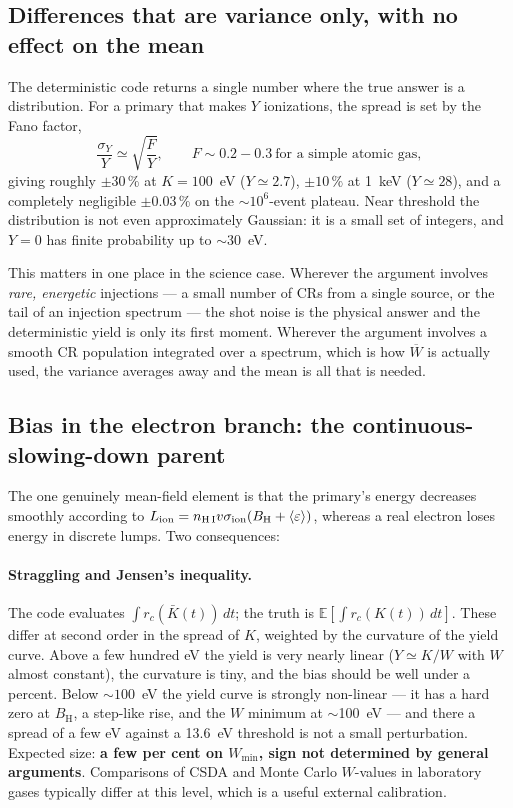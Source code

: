 \documentclass[11pt,a4paper]{article}
\newcommand{\eps}{\varepsilon}
\newcommand{\BH}{B_{\mathrm{H}}}
\newcommand{\nHI}{n_{\mathrm{H\,I}}}
\newcommand{\sion}{\sigma_{\mathrm{ion}}}
\begin{document}
\subsection{Differences that are variance only, with no effect on the mean}

The deterministic code returns a single number where the true answer is a
distribution.  For a primary that makes $Y$ ionizations, the spread is set by
the Fano factor,
\[
  \frac{\sigma_Y}{Y} \simeq \sqrt{\frac{F}{Y}}, \qquad F \sim 0.2\!-\!0.3
  \ \text{for a simple atomic gas},
\]
giving roughly $\pm 30\,\%$ at $K=100$~eV ($Y\simeq2.7$), $\pm 10\,\%$ at
1~keV ($Y\simeq28$), and a completely negligible $\pm0.03\,\%$ on the
$\sim10^{6}$-event plateau.  Near threshold the distribution is not even
approximately Gaussian: it is a small set of integers, and $Y=0$ has finite
probability up to $\sim 30$~eV.

This matters in one place in the science case.  Wherever the argument involves
\emph{rare, energetic} injections --- a small number of CRs from a single
source, or the tail of an injection spectrum --- the shot noise is the physical
answer and the deterministic yield is only its first moment.  Wherever the
argument involves a smooth CR population integrated over a spectrum, which is
how $\overline W$ is actually used, the variance averages away and the mean is
all that is needed.

\subsection{Bias in the electron branch: the continuous-slowing-down parent}

The one genuinely mean-field element is that the primary's energy decreases
smoothly according to $L_{\rm ion} = \nHI v \sion (\BH + \langle\eps\rangle)$,
whereas a real electron loses energy in discrete lumps.  Two consequences:

\paragraph{Straggling and Jensen's inequality.}  The code evaluates
$\int r_c(\bar K(t))\,dt$; the truth is $\mathbb{E}\!\left[\int
r_c(K(t))\,dt\right]$.  These differ at second order in the spread of $K$,
weighted by the curvature of the yield curve.  Above a few hundred eV the yield
is very nearly linear ($Y \simeq K/W$ with $W$ almost constant), the curvature
is tiny, and the bias should be well under a percent.  Below $\sim100$~eV the
yield curve is strongly non-linear --- it has a hard zero at $\BH$, a step-like
rise, and the $W$ minimum at $\sim$100~eV --- and there a spread of a few eV
against a 13.6~eV threshold is not a small perturbation.  Expected size:
\textbf{a few per cent on $W_{\min}$, sign not determined by general arguments}.
Comparisons of CSDA and Monte Carlo $W$-values in laboratory gases typically
differ at this level, which is a useful external calibration.
\end{document}

